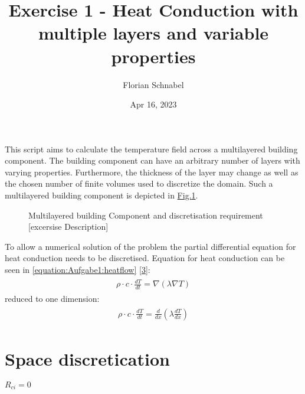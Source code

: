 \documentclass[letterpaper,10pt,english]{jupyterBook}
\title{Exercise 1 - Heat Conduction with multiple layers and variable properties}
\date{Apr 16, 2023}
\author{Florian Schnabel}
\let\sphinxpxdimen\pdfpxdimen\else\newdimen\sphinxpxdimen
\begin{document}
\pagestyle{empty}
\sphinxmaketitle
\pagestyle{plain}
\sphinxtableofcontents
\pagestyle{normal}
\label{\detokenize{Aufgabe1::doc}}




\sphinxAtStartPar
This script aims to calculate the temperature field across a multilayered building component. The building component can have an arbitrary number of layers with varying properties. Furthermore,
the thickness of the layer may change as well as the chosen number of finite volumes used to discretize
the domain. Such a multilayered building component is depicted in \hyperref[\detokenize{Aufgabe1:fig-multilaycomp}]{Fig.\@ \ref{\detokenize{Aufgabe1:fig-multilaycomp}}}.

\begin{figure}[htbp]
\centering
\capstart

\noindent\sphinxincludegraphics[width=350\sphinxpxdimen]{{BuildingComponent}.png}
\caption{Multilayered building Component and discretisation requirement {[}excersise Description{]}}\label{\detokenize{Aufgabe1:fig-multilaycomp}}\end{figure}

\sphinxAtStartPar
To allow a numerical solution of the problem the partial differential equation for heat conduction needs to be discretised. Equation for heat conduction can be seen in \eqref{equation:Aufgabe1:heatflow} {[}\hyperlink{cite.Aufgabe1:id6}{3}{]}:
\begin{equation}\label{equation:Aufgabe1:heatflow}
\begin{split}\begin{align}
\rho \cdot c \cdot \frac{dT}{dt} = \nabla (\lambda \nabla T) 
\end{align}\end{split}
\end{equation}
\sphinxAtStartPar
reduced to one dimension:
\begin{equation}\label{equation:Aufgabe1:heatflow2}
\begin{split}\begin{align}
\rho \cdot c \cdot \frac{dT}{dt} =  \frac{d}{dx}(\lambda \frac{dT}{dx}) 
\end{align}\end{split}
\end{equation}

\section{Space discretication}
\label{\detokenize{Aufgabe1:space-discretication}}
\sphinxAtStartPar
\(R_{ci} =0\)
\end{document}
